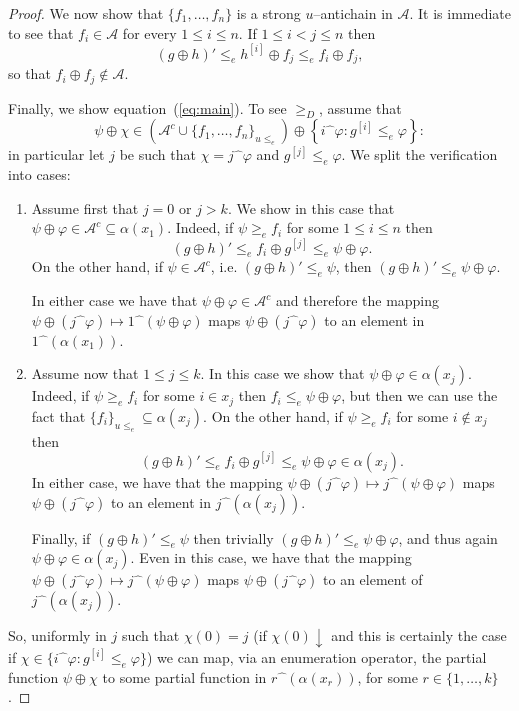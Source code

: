 \documentclass[11pt]{amsart}
\renewcommand{\phi}{\varphi}
\newcommand{\aaa}{\mathcal{A}}
\newcommand{\cat}[2]{#1\widehat{\phantom{\alpha}}\!#2}
\begin{document}
\begin{proof}
We now show that $\{f_1, \ldots, f_n\}$ is a strong $u$--antichain in $\aaa$. 
It is immediate to see that $f_i \in \aaa$ for every $1 \le i \le n$. If 
$1\le i <j \le n$ then 
\[
(g\oplus h)' \le_e h^{[i]} \oplus f_j \le_e f_i \oplus f_j,
\]
so that $f_i \oplus f_j \notin \aaa$.

Finally, we show equation~(\ref{eq:main}). To see $\ge_D$, assume that 
\[
\psi \oplus \chi \in \left(\aaa^c \cup \{f_1, \ldots, f_n\}_{u\le_e} 
\right) \oplus  \left\{ \cat{i}{\phi}: g^{[i]}\le_e \phi\right\}:
\]
in particular let $j$ be such that $\chi=\cat{j}{\phi}$ and $g^{[j]} \le_e 
\phi$. We split the verification into cases: 
\begin{enumerate}
  \item Assume first that $j=0$ or $j>k$. We show in this case that $\psi 
      \oplus \phi \in \aaa^c \subseteq \alpha(x_1)$. Indeed, if $\psi \ge_e 
      f_i$ for some $1\le i \le n$ then 
\[
(g\oplus h)' \le_e f_i \oplus g^{[j]} \le_e \psi \oplus \phi.
\]
On the other hand, if $\psi \in \aaa^c$, i.e. $(g\oplus h)'\le_e \psi$, 
        then $(g\oplus h)' \le_e \psi \oplus \phi$.
        
In either case we have that $\psi \oplus \phi \in \aaa^c$ and therefore the 
mapping $\psi \oplus (\cat{j}{\phi}) \mapsto \cat{1}{(\psi \oplus \phi)}$ 
maps $\psi \oplus (\cat{j}{\phi})$ to an element in 
$\cat{1}{(\alpha(x_1))}$. 

\item Assume now that $1 \leq j \le k$. In this case we show that $\psi 
    \oplus \phi \in \alpha(x_j)$. Indeed, if $\psi \ge_e f_i$ for some $i 
    \in x_j$ then $f_i \le_e \psi \oplus \phi$, but then we can use the 
    fact that $\{f_i\}_{u\le_e} \subseteq \alpha(x_j)$. On the other hand, 
    if $\psi \ge_e f_i$ for some $i \notin x_j$ then 
    \[ 
    (g\oplus h)' \le_e  f_i  \oplus g^{[j]} \le_e 
    \psi \oplus \phi\in \alpha(x_j).
    \] 
In either case, we have that the mapping  $\psi \oplus (\cat{j}{\phi}) 
\mapsto \cat{j}{(\psi \oplus \phi)}$ maps $\psi \oplus (\cat{j}{\phi})$ to 
an element in $\cat{j}{(\alpha(x_j))}$. 
    
Finally, if $(g\oplus h)'\le_e \psi$ then trivially  $(g\oplus h)'\le_e 
    \psi\oplus \phi$, and thus again $\psi\oplus \phi \in \alpha(x_j)$. 
    Even in this case, we have that the mapping  $\psi \oplus 
    (\cat{j}{\phi}) \mapsto \cat{j}{(\psi \oplus \phi)}$ maps $\psi \oplus 
(\cat{j}{\phi})$ to an element of $\cat{j}{(\alpha(x_j))}$. 
\end{enumerate}
So, uniformly in $j$ such that $\chi(0)=j$ (if $\chi(0)\downarrow$ and this 
is certainly the case if $\chi \in \{ \cat{i}{\phi}: g^{[i]}\le_e \phi\}$) we 
can map, via an enumeration operator, the partial function $\psi \oplus \chi$ 
to some partial function in $\cat{r}{(\alpha(x_r))}$, for some $r\in \{1, 
\ldots, k\}$. 


\end{proof}
\end{document}
